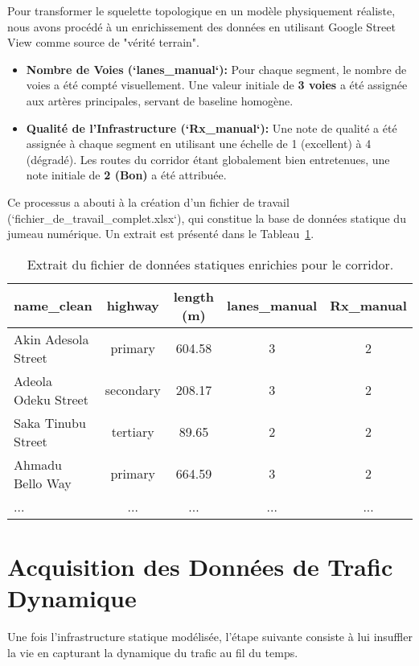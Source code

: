Pour transformer le squelette topologique en un modèle physiquement réaliste, nous avons procédé à un enrichissement des données en utilisant Google Street View comme source de "vérité terrain".
\begin{itemize}
    \item \textbf{Nombre de Voies (`lanes\_manual`):} Pour chaque segment, le nombre de voies a été compté visuellement. Une valeur initiale de \textbf{3 voies} a été assignée aux artères principales, servant de baseline homogène.
    \item \textbf{Qualité de l'Infrastructure (`Rx\_manual`):} Une note de qualité a été assignée à chaque segment en utilisant une échelle de 1 (excellent) à 4 (dégradé). Les routes du corridor étant globalement bien entretenues, une note initiale de \textbf{2 (Bon)} a été attribuée.
\end{itemize}
Ce processus a abouti à la création d'un fichier de travail (`fichier\_de\_travail\_complet.xlsx`), qui constitue la base de données statique du jumeau numérique. Un extrait est présenté dans le Tableau~\ref{tab:extrait_donnees_statiques}.

\begin{table}[htbp]
    \centering
    \caption{Extrait du fichier de données statiques enrichies pour le corridor.}
    \label{tab:extrait_donnees_statiques}
    \begin{tabular}{l c c c c}
        \toprule
        \textbf{name\_clean} & \textbf{highway} & \textbf{length (m)} & \textbf{lanes\_manual} & \textbf{Rx\_manual} \\
        \midrule
        Akin Adesola Street & primary & 604.58 & 3 & 2 \\
        Adeola Odeku Street & secondary & 208.17 & 3 & 2 \\
        Saka Tinubu Street & tertiary & 89.65 & 2 & 2 \\
        Ahmadu Bello Way & primary & 664.59 & 3 & 2 \\
        ... & ... & ... & ... & ... \\
        \bottomrule
    \end{tabular}
\end{table}

\section{Acquisition des Données de Trafic Dynamique}
\label{sec:acquisition_dynamique_data}

Une fois l'infrastructure statique modélisée, l'étape suivante consiste à lui insuffler la vie en capturant la dynamique du trafic au fil du temps.

